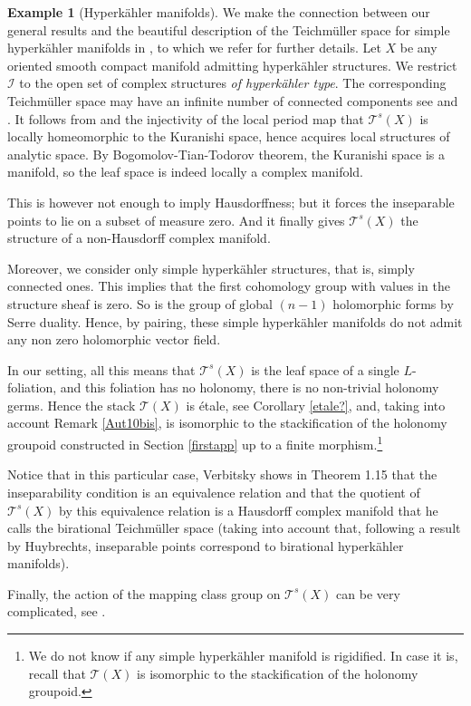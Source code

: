 \documentclass[JEP,XML,SOM,Unicode]{cedram}
\let\mathcal\mathscr
\theoremstyle{plain}
\theoremstyle{definition}
\newtheorem{example}[theorem]{Example}
\theoremstyle{remark}
\numberwithin{equation}{section}
\newcommand{\cI}{\mathcal{I}}
\begin{document}
\begin{example}[Hyperkähler manifolds]
\label{HK}
We make the connection between our general results and the beautiful description of the Teichmüller space for simple hyperkähler manifolds in \cite{Verbitsky}, to which we refer for further details. Let $X$ be any oriented smooth compact manifold admitting hyperkähler structures. We restrict $\cI$ to the open set of complex structures \emph{of hyperkähler type}. The corresponding Teichmüller space may have an infinite number of connected components see \cite{KS} and \cite{VerbitskyCorrige}. It follows from \cite[Prop.\,15]{Catsurvey} and the injectivity of the local period map that $\mathcal T^s(X)$ is locally homeomorphic to the Kuranishi space, hence acquires local structures of analytic space. By Bogomolov-Tian-Todorov theorem, the Kuranishi space is a manifold, so the leaf space is indeed locally a complex manifold.

This is however not enough to imply Hausdorffness; but it forces the inseparable points to lie on a subset of measure zero. And it finally gives $\mathcal T^s(X)$ the structure of a non-Hausdorff complex manifold.

Moreover, we consider only simple hyperkähler structures, that is, simply connected ones. This implies that the first cohomology group with values in the structure sheaf is zero. So is the group of global $(n-1)$ holomorphic forms by Serre duality. Hence, by pairing, these simple hyperkähler manifolds do not admit any non zero holomorphic vector field.

In our setting, all this means that
$\mathcal T^s(X)$ is the leaf space of a single $L$-foliation, and this foliation has no holonomy, \ie there is no non-trivial holonomy germs. Hence the stack $\mathcal T(X)$ is étale, see Corollary \ref{etale?}, and, taking into account Remark \ref{Aut10bis}, is isomorphic to the stackification of the holonomy groupoid constructed in Section \ref{firstapp} up to a finite morphism.\footnote{We do not know if any simple hyperkähler manifold is rigidified. In case it is, recall that $\mathcal T(X)$ is isomorphic to the stackification of the holonomy groupoid.}

Notice that in this particular case, Verbitsky shows in Theorem 1.15 that the inseparability condition is an equivalence relation and that the quotient of $\mathcal T^s(X)$ by this equivalence relation is a Hausdorff complex manifold that he calls the birational Teichmüller space (taking into account that, following a result by Huybrechts, inseparable points correspond to birational hyperkähler manifolds).

Finally, the action of the mapping class group on $\mathcal T^s(X)$ can be very complicated, see \cite{VerbitskyErgodic}.
\end{example}
\end{document}
